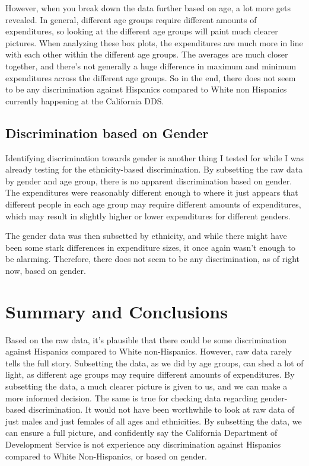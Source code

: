\documentclass[12pt,letterpaper]{article}
\begin{document}
	However, when you break down the data further based on age, a lot more gets revealed. In general, different age groups require different amounts of expenditures, so looking at the different age groups will paint much clearer pictures. When analyzing these box plots, the expenditures are much more in line with each other within the different age groups. The averages are much closer together, and there's not generally a huge difference in maximum and minimum expenditures across the different age groups. So in the end, there does not seem to be any discrimination against Hispanics compared to White non Hispanics currently happening at the California DDS.
	
	\subsection{Discrimination based on Gender}
	Identifying discrimination towards gender is another thing I tested for while I was already testing for the ethnicity-based discrimination. By subsetting the raw data by gender and age group, there is no apparent discrimination based on gender. The expenditures were reasonably different enough to where it just appears that different people in each age group may require different amounts of expenditures, which may result in slightly higher or lower expenditures for different genders.
	
	The gender data was then subsetted by ethnicity, and while there might have been some stark differences in expenditure sizes, it once again wasn't enough to be alarming. Therefore, there does not seem to be any discrimination, as of right now, based on gender.
	
	\section{Summary and Conclusions}
	Based on the raw data, it's plausible that there could be some discrimination against Hispanics compared to White non-Hispanics. However, raw data rarely tells the full story. Subsetting the data, as we did by age groups, can shed a lot of light, as different age groups may require different amounts of expenditures. By subsetting the data, a much clearer picture is given to us, and we can make a more informed decision. The same is true for checking data regarding gender-based discrimination. It would not have been worthwhile to look at raw data of just males and just females of all ages and ethnicities. By subsetting the data, we can ensure a full picture, and confidently say the California Department of Development Service is not experience any discrimination against Hispanics compared to White Non-Hispanics, or based on gender.
	
\end{document}
